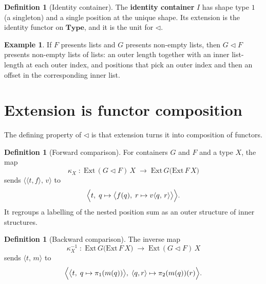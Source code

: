 \documentclass[11pt,a4paper]{article}
\theoremstyle{plain}
\theoremstyle{definition}
\newtheorem{definition}[theorem]{Definition}
\newtheorem{example}[theorem]{Example}
\newcommand{\Ext}{\mathrm{Ext}}
\newcommand{\Type}{\mathbf{Type}}
\newcommand{\compop}{\mathbin{\triangleleft}}
\begin{document}
\begin{definition}[Identity container]\label{def:I}
The \textbf{identity container} $I$ has shape type $1$ (a singleton) and a
single position at the unique shape. Its extension is the identity functor on
$\Type$, and it is the unit for $\compop$.
\end{definition}

\begin{example}
If $F$ presents lists and $G$ presents non-empty lists, then $G\compop F$
presents non-empty lists of lists: an outer length together with an inner
list-length at each outer index, and positions that pick an outer index and
then an offset in the corresponding inner list.
\end{example}

\section{Extension is functor composition}

The defining property of $\compop$ is that extension turns it into composition
of functors.

\begin{definition}[Forward comparison]\label{def:comp-ext}
For containers $G$ and $F$ and a type $X$, the map
\begin{equation}
  \kappa_X \;:\;
  \Ext\,(G\compop F)\,X
  \;\longrightarrow\;
  \Ext\,G\bigl(\Ext\,F\,X\bigr)
\end{equation}
sends $\bigl\langle\langle t,f\rangle,\,v\bigr\rangle$ to
\begin{equation}
  \Bigl\langle
    t,\;
    q \mapsto
    \bigl\langle
      f(q),\;
      r \mapsto v\langle q,\,r\rangle
    \bigr\rangle
  \Bigr\rangle.
\end{equation}
It regroups a labelling of the nested position sum as an outer structure of
inner structures.
\end{definition}

\begin{definition}[Backward comparison]\label{def:comp-ext-inv}
The inverse map
\begin{equation}
  \kappa_X^{-1} \;:\;
  \Ext\,G\bigl(\Ext\,F\,X\bigr)
  \;\longrightarrow\;
  \Ext\,(G\compop F)\,X
\end{equation}
sends $\langle t,\,m\rangle$ to
\begin{equation}
  \Bigl\langle
    \bigl\langle t,\; q\mapsto \pi_1(m(q))\bigr\rangle,\;
    \langle q,r\rangle \mapsto \pi_2(m(q))(r)
  \Bigr\rangle.
\end{equation}
\end{definition}
\end{document}
